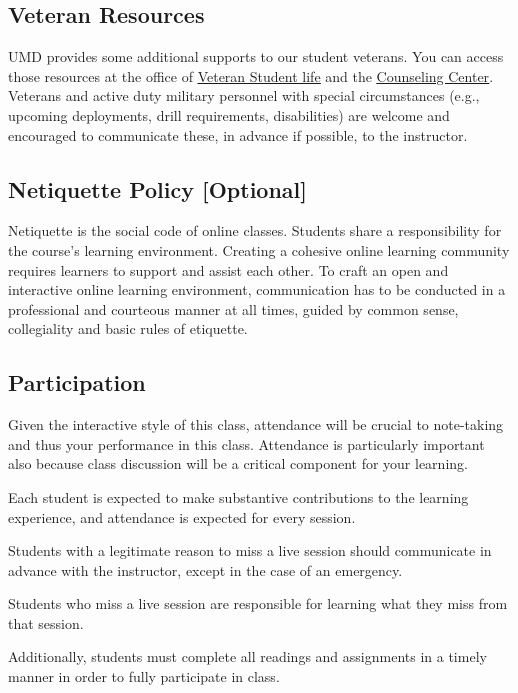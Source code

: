 \documentclass[11pt,usenames,dvipsnames,svgnames,x11names,letterpaper]{article}
\newcommand{\urllink}[2]{\href{#1}{\textcolor{Tomato3}{{{\tiny\faChevronRight}\uline{#2}}}}}
\begin{document}
\subsection{Veteran Resources}
UMD provides some additional supports to our student veterans. You can access those resources at the office of \urllink{https://stamp.umd.edu/engagement/veteran_student_life}{Veteran Student life} and the \urllink{https://counseling.umd.edu/aboutus}{Counseling Center}. Veterans and active duty military personnel with special circumstances (e.g., upcoming deployments, drill requirements, disabilities) are welcome and encouraged to communicate these, in advance if possible, to the instructor.

\subsection{Netiquette Policy [Optional]}
Netiquette is the social code of online classes. Students share a responsibility for the course's learning environment. Creating a cohesive online learning community requires learners to support and assist each other. To craft an open and interactive online learning environment, communication has to be conducted in a professional and courteous manner at all times, guided by common sense, collegiality and basic rules of etiquette.

\subsection{Participation}

\begin{compactitem}
\item Given the interactive style of this class, attendance will be crucial to note-taking and thus your performance
in this class. Attendance is particularly important also because class discussion will be a critical component
for your learning.
\item Each student is expected to make substantive contributions to the learning experience, and attendance is
expected for every session.
\item Students with a legitimate reason to miss a live session should communicate in advance with the instructor,
except in the case of an emergency.
\item Students who miss a live session are responsible for learning what they miss from that session.
\item Additionally, students must complete all readings and assignments in a timely manner in order to fully
participate in class.
\end{compactitem}
\end{document}
